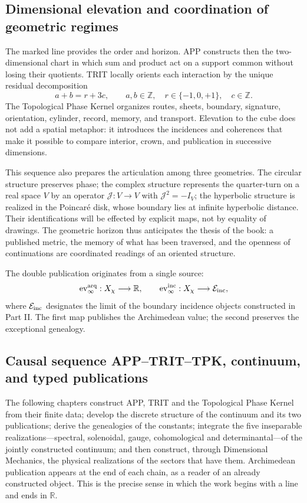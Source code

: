 \subsection*{Dimensional elevation and coordination of geometric regimes}

The marked line provides the order and horizon. APP constructs then
the two-dimensional chart in which sum and product act on a support
common without losing their quotients. TRIT locally orients each interaction by
the unique residual decomposition
\[
 a+b=r+3c,
 \qquad a,b\in\mathbb Z,\quad
 r\in\{-1,0,+1\},\quad c\in\mathbb Z.
\]
The Topological Phase Kernel organizes routes, sheets, boundary, signature,
orientation, cylinder, record, memory, and transport. Elevation to the cube
does not add a spatial metaphor: it introduces the incidences and coherences that
make it possible to compare interior, crown, and publication in successive dimensions.

This sequence also prepares the articulation among three geometries. The
circular structure preserves phase; the complex structure represents the
quarter-turn on a real space \(V\) by an operator
\(\mathcal J:V\to V\) with \(\mathcal J^2=-I_V\); the hyperbolic structure
is realized in the Poincaré disk, whose boundary lies at infinite
hyperbolic distance. Their identifications will be effected by explicit
maps, not by equality of drawings. The geometric horizon thus anticipates
the thesis of the book: a published metric, the memory of what has been traversed, and the
openness of continuations are coordinated readings of an oriented
structure.

The double publication originates from a single source:
\[
 \operatorname{ev}^{\rm arq}_\infty:X_\chi\longrightarrow\mathbb R,
 \qquad
 \operatorname{ev}^{\rm inc}_\infty:X_\chi\longrightarrow\mathcal E_{\rm inc},
\]
where \(\mathcal E_{\rm inc}\) designates the limit of the boundary
incidence objects constructed in Part II. The first map publishes the
Archimedean value; the second preserves the exceptional genealogy.

\subsection*{Causal sequence APP–TRIT–TPK, continuum, and typed publications}

The following chapters construct APP, TRIT and the Topological Phase Kernel
from their finite data; develop the discrete structure of the continuum and
its two publications; derive the genealogies of the constants; integrate
the five inseparable realizations—spectral, solenoidal, gauge,
cohomological and determinantal—of the jointly constructed continuum; and then construct,
through Dimensional Mechanics, the physical realizations of the sectors that
have them. Archimedean
publication appears at the end of each chain, as a reader of an already
constructed object. This is the precise sense in which the work begins with a line
and ends in \(\mathbb R\).

